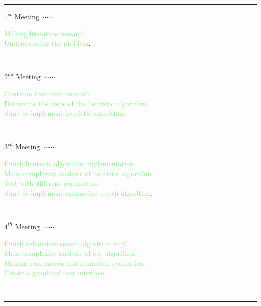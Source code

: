 \documentclass{beamer}
\newcommand\ytl[2]{
\parbox[b]{9em}{\hfill{\color{cyan}\bfseries\sffamily #1}~$\cdots\cdots$~}\makebox[0pt][c]{$\bullet$}\vrule\quad \parbox[c]{8cm}{\vspace{8pt}\color{red!40!black!80}\raggedright\sffamily #2.\\[7pt]}\\[-3pt]}
\begin{document}
\begin{projecttimeline}

\begin{table}
\begin{minipage}[t]{\linewidth}
\color{gray}
\rule{\linewidth}{0.2pt}
\ytl{$1^{st} \textrm{ Meeting}$}{
\textcolor{lightgreen}{Making literature research.}\\
\textcolor{lightgreen}{Understanding the problem}}
\ytl{$2^{nd} \textrm{ Meeting}$}{
        \textcolor{lightgreen}{Continue literature research.} \\
        \textcolor{lightgreen}{Determine the steps of the heuristic algorithm.} \\
        \textcolor{lightgreen}{Start to implement heuristic algorithm}}
\ytl{$3^{rd} \textrm{ Meeting}$}{ 
    \textcolor{lightgreen}{Finish heuristic algorithm implementation.} \\
        \textcolor{lightgreen}{Make complexity analysis of heuristic algorithm.} \\
        \textcolor{lightgreen}{Test with different parameters.} \\
        \textcolor{lightgreen}{Start to implement exhaustive search algorithm}}
\ytl{$4^{th} \textrm{ Meeting}$}{
\textcolor{lightgreen}{Finish exhaustive search algorithm impl.} \\
\textcolor{lightgreen}{Make complexity analysis of e.s. algorithm.} \\
\textcolor{lightgreen}{Making comparison and numerical evaluation.} \\
\textcolor{lightgreen}{Create a graphical user interface}}
\bigskip
\rule{\linewidth}{0.2pt}%
\end{minipage}%
\end{table}
 
\end{projecttimeline}

\begin{projectreferences}

 \setlength{\emergencystretch}{1em}
\printbibliography
{}
 \nocite{book7,zero,Two}
\end{projectreferences}

\begin{finish}

\end{finish}
\end{document}
